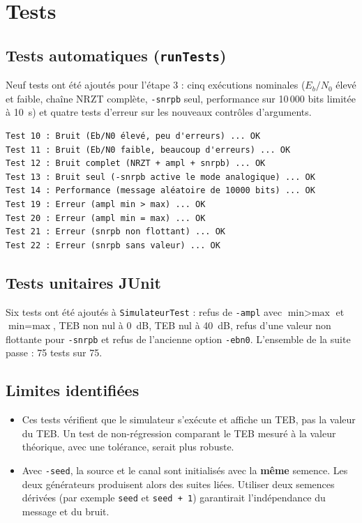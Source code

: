 \documentclass[11pt,a4paper]{article}
\newcommand{\EbNo}{E_b/N_0}
\begin{document}
\section{Tests}
\subsection{Tests automatiques (\texttt{runTests})}
Neuf tests ont été ajoutés pour l'étape 3 : cinq exécutions nominales ($\EbNo$ élevé et faible, chaîne NRZT complète, \texttt{-snrpb} seul, performance sur 10\,000 bits limitée à 10~s) et quatre tests d'erreur sur les nouveaux contrôles d'arguments.
\begin{lstlisting}[language={}]
Test 10 : Bruit (Eb/N0 élevé, peu d'erreurs) ... OK
Test 11 : Bruit (Eb/N0 faible, beaucoup d'erreurs) ... OK
Test 12 : Bruit complet (NRZT + ampl + snrpb) ... OK
Test 13 : Bruit seul (-snrpb active le mode analogique) ... OK
Test 14 : Performance (message aléatoire de 10000 bits) ... OK
Test 19 : Erreur (ampl min > max) ... OK
Test 20 : Erreur (ampl min = max) ... OK
Test 21 : Erreur (snrpb non flottant) ... OK
Test 22 : Erreur (snrpb sans valeur) ... OK
\end{lstlisting}

\subsection{Tests unitaires JUnit}
Six tests ont été ajoutés à \texttt{SimulateurTest} : refus de \texttt{-ampl} avec $\text{min} > \text{max}$ et $\text{min} = \text{max}$, TEB non nul à 0~dB, TEB nul à 40~dB, refus d'une valeur non flottante pour \texttt{-snrpb} et refus de l'ancienne option \texttt{-ebn0}. L'ensemble de la suite passe : 75 tests sur 75.

\subsection{Limites identifiées}
\begin{itemize}
  \item Ces tests vérifient que le simulateur s'exécute et affiche un TEB, pas la valeur du TEB. Un test de non-régression comparant le TEB mesuré à la valeur théorique, avec une tolérance, serait plus robuste.
  \item Avec \texttt{-seed}, la source et le canal sont initialisés avec la \textbf{même} semence. Les deux générateurs produisent alors des suites liées. Utiliser deux semences dérivées (par exemple \texttt{seed} et \texttt{seed + 1}) garantirait l'indépendance du message et du bruit.
\end{itemize}
\end{document}
